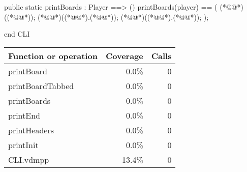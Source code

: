 \begin{vdm_al}
  public static printBoards : Player ==> ()
   printBoards(player) == (
    (*@@*)((*@@*));
    (*@@*)((*@@*).(*@@*));
    (*@@*)((*@@*).(*@@*));
   );
  
end CLI
\end{vdm_al}
\bigskip
\begin{longtable}{|l|r|r|}
\hline
Function or operation & Coverage & Calls \\
\hline
\hline
printBoard & 0.0\% & 0 \\
\hline
printBoardTabbed & 0.0\% & 0 \\
\hline
printBoards & 0.0\% & 0 \\
\hline
printEnd & 0.0\% & 0 \\
\hline
printHeaders & 0.0\% & 0 \\
\hline
printInit & 0.0\% & 0 \\
\hline
\hline
CLI.vdmpp & 13.4\% & 0 \\
\hline
\end{longtable}

